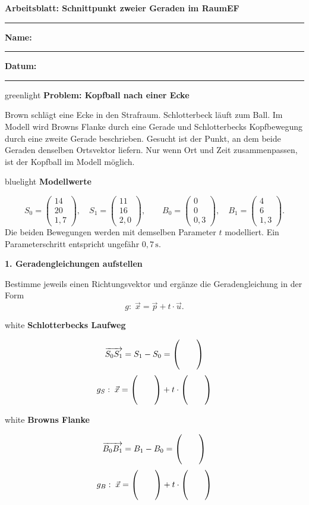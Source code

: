 \documentclass[11pt,a4paper]{article}
\newcommand{\vektor}[3]{\begin{pmatrix}#1\\#2\\#3\end{pmatrix}}
\begin{document}
\pagestyle{empty}

{\Large\bfseries Arbeitsblatt: Schnittpunkt zweier Geraden im Raum}\hfill {\bfseries EF}\par
{\color{green}\rule{\linewidth}{1.2pt}}
\textbf{Name:} \rule{0.34\linewidth}{0.4pt}\hfill\textbf{Datum:} \rule{0.22\linewidth}{0.4pt}

\begin{arbeitsbox}{greenlight}
\textbf{Problem: Kopfball nach einer Ecke}\par
Brown schlägt eine Ecke in den Strafraum. Schlotterbeck läuft zum Ball. Im Modell wird Browns Flanke durch eine Gerade und Schlotterbecks Kopfbewegung durch eine zweite Gerade beschrieben. Gesucht ist der Punkt, an dem beide Geraden denselben Ortsvektor liefern. Nur wenn Ort und Zeit zusammenpassen, ist der Kopfball im Modell möglich.
\end{arbeitsbox}

\begin{arbeitsbox}{bluelight}
\textbf{Modellwerte}\par
\[
S_0=\vektor{14}{20}{1{,}7},\quad S_1=\vektor{11}{16}{2{,}0},\qquad
B_0=\vektor{0}{0}{0{,}3},\quad B_1=\vektor{4}{6}{1{,}3}.
\]
Die beiden Bewegungen werden mit demselben Parameter \(t\) modelliert. Ein Parameterschritt entspricht ungefähr \(0{,}7\,\mathrm{s}\).
\end{arbeitsbox}

\textbf{1. Geradengleichungen aufstellen}\par
Bestimme jeweils einen Richtungsvektor und ergänze die Geradengleichung in der Form
\[
g:\;\vec{x}=\vec{p}+t\cdot\vec{u}.
\]

\begin{arbeitsbox}{white}
\textbf{Schlotterbecks Laufweg}\par
\[
\overrightarrow{S_0S_1}=S_1-S_0=
\vektor{\hspace{0.7cm}}{\hspace{0.7cm}}{\hspace{0.7cm}}
\]
\[
g_S:\;\vec{x}=\vektor{\hspace{0.7cm}}{\hspace{0.7cm}}{\hspace{0.7cm}}+t\cdot
\vektor{\hspace{0.7cm}}{\hspace{0.7cm}}{\hspace{0.7cm}}
\]
\end{arbeitsbox}

\begin{arbeitsbox}{white}
\textbf{Browns Flanke}\par
\[
\overrightarrow{B_0B_1}=B_1-B_0=
\vektor{\hspace{0.7cm}}{\hspace{0.7cm}}{\hspace{0.7cm}}
\]
\[
g_B:\;\vec{x}=\vektor{\hspace{0.7cm}}{\hspace{0.7cm}}{\hspace{0.7cm}}+t\cdot
\vektor{\hspace{0.7cm}}{\hspace{0.7cm}}{\hspace{0.7cm}}
\]
\end{arbeitsbox}
\end{document}
